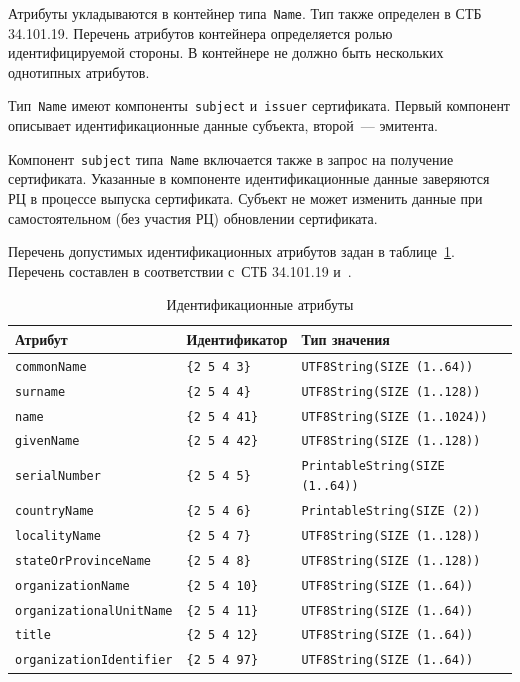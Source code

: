 Атрибуты укладываются в контейнер типа~\texttt{Name}. Тип также определен в 
СТБ 34.101.19. Перечень атрибутов контейнера определяется ролью идентифицируемой 
стороны. В контейнере не должно быть нескольких однотипных атрибутов.

Тип~\texttt{Name} имеют компоненты~\texttt{subject} и~\texttt{issuer} 
сертификата. Первый компонент описывает идентификационные данные субъекта, 
второй~--- эмитента.

Компонент~\texttt{subject} типа~\texttt{Name} включается также в запрос на 
получение сертификата. Указанные в компоненте идентификационные данные
заверяются РЦ в процессе выпуска сертификата. Субъект не может изменить 
данные при самостоятельном (без участия РЦ) обновлении сертификата. 

Перечень допустимых идентификационных атрибутов задан в 
таблице~\ref{Table.ENTITIES.Attrs}. Перечень составлен в соответствии 
с~СТБ 34.101.19 и~\cite{X520}.  

\begin{table}[bht]
\caption{Идентификационные атрибуты}
\label{Table.ENTITIES.Attrs}
\begin{tabular}{|l|l|l|}
\hline
Атрибут & Идентификатор & Тип значения\\
\hline
\hline
\texttt{commonName} & \verb|{2 5 4 3}| & \texttt{UTF8String(SIZE (1..64))}\\
\texttt{surname} & \verb|{2 5 4 4}| & \texttt{UTF8String(SIZE (1..128))}\\
\texttt{name} & \verb|{2 5 4 41}| & \texttt{UTF8String(SIZE (1..1024))}\\
\texttt{givenName} & \verb|{2 5 4 42}| & \texttt{UTF8String(SIZE (1..128))}\\
\texttt{serialNumber} & \verb|{2 5 4 5}| & \texttt{PrintableString(SIZE (1..64))}\\
\texttt{countryName} & \verb|{2 5 4 6}| & \texttt{PrintableString(SIZE (2))}\\
\texttt{localityName} & \verb|{2 5 4 7}| & \texttt{UTF8String(SIZE (1..128))}\\
\texttt{stateOrProvinceName} & \verb|{2 5 4 8}| & \texttt{UTF8String(SIZE (1..128))}\\
\texttt{organizationName} & \verb|{2 5 4 10}| & \texttt{UTF8String(SIZE (1..64))}\\
\texttt{organizationalUnitName} & \verb|{2 5 4 11}| & \texttt{UTF8String(SIZE (1..64))}\\
\texttt{title} & \verb|{2 5 4 12}| & \texttt{UTF8String(SIZE (1..64))}\\
\texttt{organizationIdentifier} & \verb|{2 5 4 97}| & \texttt{UTF8String(SIZE (1..64))}\\
\hline                                      
\end{tabular}
\end{table}

